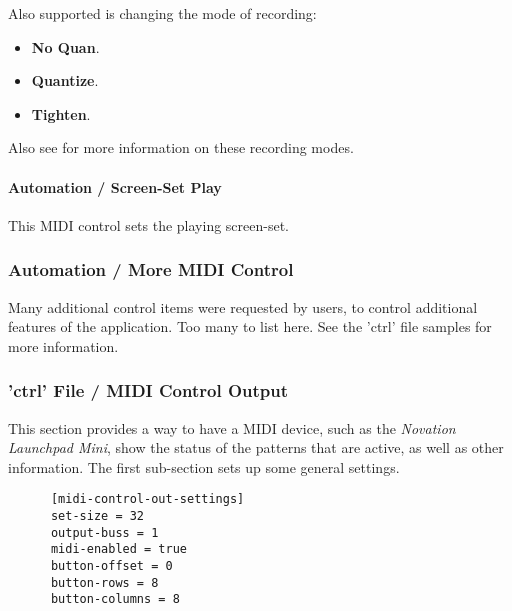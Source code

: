   Also supported is changing the mode of recording:

   \begin{itemize}
      \item \textbf{No Quan}.
      \item \textbf{Quantize}.
      \item \textbf{Tighten}.
      \end{itemize}

   Also see  for more information on these
   recording modes.

\paragraph{Automation / Screen-Set Play}
\label{paragraph:configuration_midi_ctrl_ssplay}

This MIDI control sets the playing screen-set.

\subsubsection{Automation / More MIDI Control}
\label{subsubsec:configuration_midi_ctrl_automationex}

   Many additional control items were requested by users, to control
   additional features of the application.  Too many to list here.
   See the 'ctrl' file samples for more information.

\subsubsection{'ctrl' File / MIDI Control Output}
\label{subsubsec:configuration_ctrl_midi_control_out}

   This section provides a way to have a MIDI device, such as the
   \textsl{Novation Launchpad Mini}, show the status
   of the patterns that are active, as well as other information.
   The first sub-section sets up some general settings.

   \begin{verbatim}
      [midi-control-out-settings]
      set-size = 32
      output-buss = 1
      midi-enabled = true
      button-offset = 0
      button-rows = 8
      button-columns = 8
   \end{verbatim}

